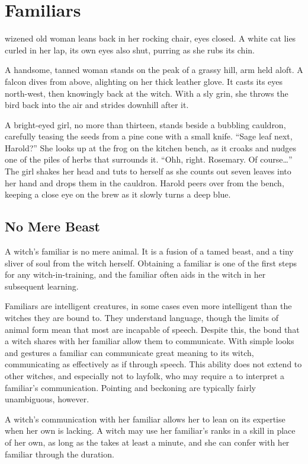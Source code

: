 \chapter{Familiars}

 wizened old woman leans back in her rocking chair, eyes closed.
A white cat lies curled in her lap, its own eyes also shut, purring as she rubs its chin.

A handsome, tanned woman stands on the peak of a grassy hill, arm held aloft.
A falcon dives from above, alighting on her thick leather glove.
It casts its eyes north-west, then knowingly back at the witch.
With a sly grin, she throws the bird back into the air and strides downhill after it.

A bright-eyed girl, no more than thirteen, stands beside a bubbling cauldron, carefully teasing the seeds from a pine cone with a small knife.
``Sage leaf next, Harold?''
She looks up at the frog on the kitchen bench, as it croaks and nudges one of the piles of herbs that surrounds it.
``Ohh, right. Rosemary. Of course{\dots}''
The girl shakes her head and tuts to herself as she counts out seven leaves into her hand and drops them in the cauldron.
Harold peers over from the bench, keeping a close eye on the brew as it slowly turns a deep blue.

\section{No Mere Beast}

A witch's familiar is no mere animal.
It is a fusion of a tamed beast, and a tiny sliver of soul from the witch herself.
Obtaining a familiar is one of the first steps for any witch-in-training, and the familiar often aids in the witch in her subsequent learning.

Familiars are intelligent creatures, in some cases even more intelligent than the witches they are bound to.
They understand language, though the limits of animal form mean that most are incapable of speech.
Despite this, the bond that a witch shares with her familiar allow them to communicate.
With simple looks and gestures a familiar can communicate great meaning to its witch, communicating as effectively as if through speech.
This ability does not extend to other witches, and especially not to layfolk, who may require a {\test} to interpret a familiar's communication.
Pointing and beckoning are typically fairly unambiguous, however.

A witch's communication with her familiar allows her to lean on its expertise when her own is lacking.
A witch may use her familiar's ranks in a skill in place of her own, as long as the {\test} takes at least a minute, and she can confer with her familiar through the duration.

